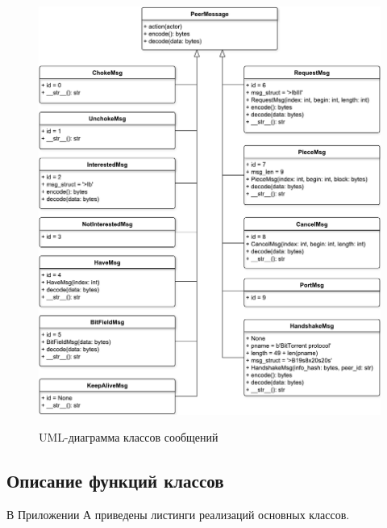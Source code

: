\newpage

\begin{figure}[h!]
	\begin{center}
		{\includegraphics[scale = 0.57]{img/msgs.pdf}}
		\caption{UML-диаграмма классов сообщений}
		\label{fig301:image}
	\end{center}
\end{figure}

\subsection{Описание функций классов}
В Приложении А приведены листинги реализаций основных классов.

